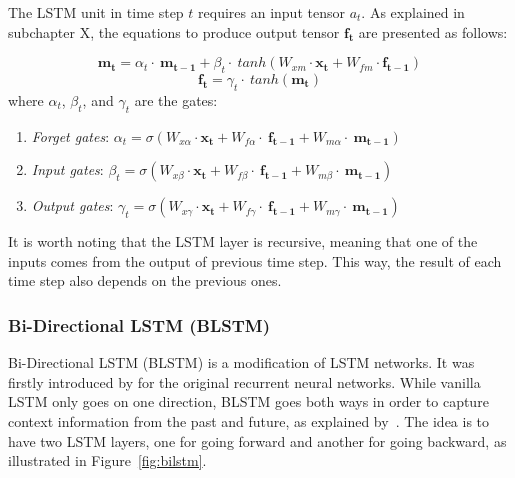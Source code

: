The LSTM unit in time step $t$ requires an input tensor $a_{t}$. As explained in subchapter X, the equations to produce output tensor $\mathbf{f_{t}}$ are presented as follows:

\begin{equation}\label{eq:lstmm}
\mathbf{m_{t}}=\alpha_{t}\cdot~\mathbf{m_{t-1}} + \beta_{t}\cdot~tanh(W_{xm} \cdot \mathbf{x_{t}} + W_{fm} \cdot \mathbf{f_{t-1}})
\end{equation}
\begin{equation}\label{eq:lstmh}
\mathbf{f_{t}}=\gamma_{t}\cdot~tanh(\mathbf{m_{t}})
\end{equation}
where
$ \alpha_t $, $ \beta_t $, and $ \gamma_t $ are the gates:
\begin{enumerate}
	\item \textit{Forget gates}: $ \alpha_{t}=\sigma(W_{x\alpha} \cdot \mathbf{x_{t}}+W_{f\alpha}\cdot~\mathbf{f_{t-1}}+W_{m\alpha}\cdot~\mathbf{m_{t-1}}) $
	\item \textit{Input gates}: $ \beta_{t}=\sigma(W_{x\beta}\cdot \mathbf{x_{t}}+W_{f\beta}\cdot~\mathbf{f_{t-1}}+W_{m\beta}\cdot~\mathbf{m_{t-1}}) $
	\item \textit{Output gates}: $ \gamma_{t}=\sigma(W_{x\gamma}\cdot \mathbf{x_{t}}+W_{f\gamma}\cdot~\mathbf{f_{t-1}}+W_{m\gamma}\cdot~\mathbf{m_{t-1}}) $
\end{enumerate}

It is worth noting that the LSTM layer is recursive, meaning that one of the inputs comes from the output of previous time step. This way, the result of each time step also depends on the previous ones.


\subsubsection{Bi-Directional LSTM (BLSTM)}
\label{sec:blstm}
Bi-Directional LSTM (BLSTM) is a modification of LSTM networks. It was firstly introduced by \cite{schuster1997bidirectional} for the original recurrent neural networks. While vanilla LSTM only goes on one direction, BLSTM goes both ways in order to capture context information from the past and future, as explained by~\cite{zhou2015end}. The idea is to have two LSTM layers, one for going forward and another for going backward, as illustrated in Figure~\ref{fig:bilstm}.

